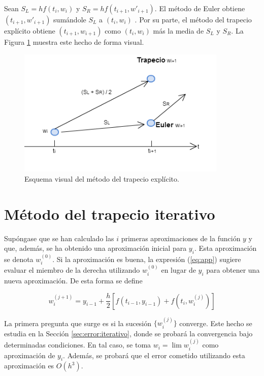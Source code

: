 \documentclass{article}
\theoremstyle{theorem-style}  %
\theoremstyle{definition}
\theoremstyle{example-style}
\begin{document}
		Sean $S_L = h f(t_i,w_i) $ y $S_R = h f(t_{i+1}, w'_{i+1})$. El método de Euler  obtiene $(t_{i+1}, w'_{i+1})$ sumándole $S_L$ a $(t_{i}, w_{i})$ . Por su parte, el método del trapecio explícito obtiene $(t_{i+1}, w_{i+1})$ como $(t_{i}, w_{i})$ más la media de $S_L$ y $S_R$. La Figura \ref{fig:trapecio-vs-euler} muestra este hecho de forma visual.
			
		\begin{figure}[H]
			\centering
			\includegraphics[width=10cm]{./Images/trapecio-vs-euler.png}
			\caption{Esquema visual del método del trapecio explícito.} 
			\label{fig:trapecio-vs-euler}
		\end{figure}


\section{Método del trapecio iterativo} \label{sec:trapecio-iterativo}
	
	Supóngase que se han calculado las $i$ primeras aproximaciones de la función $y$ y que, además, se ha obtenido una aproximación inicial para $y_i$. Esta aproximación se denota $w_i^{(0)}$. Si la aproximación es buena, la expresión (\ref{eq:app}) sugiere evaluar el miembro de la derecha utilizando $w_i^{(0)}$ en lugar de $y_i$ para obtener una nueva aproximación. De esta forma se define
	
	\begin{equation} \label{eq:ti-def}
	w_{i} ^{(j+1)} = y_{i-1} + \frac{h}{2} \left[f(t_{i-1}, y_{i-1}) + f(t_i, w_{i}^{(j)})\right]
	\end{equation}
	
	La primera pregunta que surge es si la sucesión $\{w_{i}^{(j)}\}$ converge. Este hecho se estudia en la Sección \ref{sec:error:iterativo}, donde se probará la convergencia bajo determinadas condiciones. En tal caso, se toma $w_i = \lim w_i^{(j)}$ como aproximación de $y_i$. Además, se probará que el error cometido utilizando esta aproximación es $O(h^3)$.
	
\end{document}
